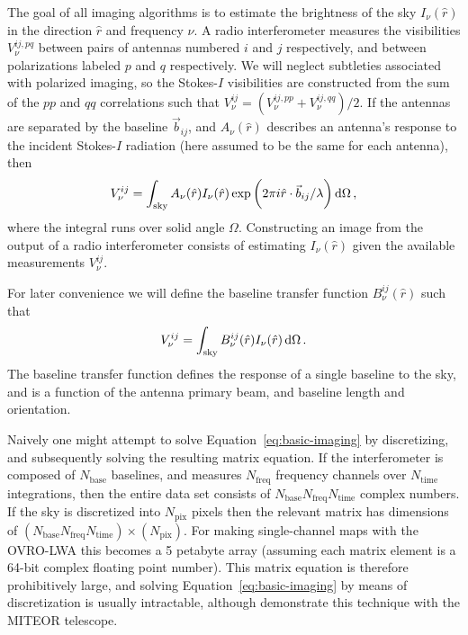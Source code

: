 \documentclass[twocolumn]{aastex61}
\renewcommand{\d}{{\rm d}}
\begin{document}
The goal of all imaging algorithms is to estimate the brightness of the sky $I_\nu(\hat r)$ in the
direction $\hat r$ and frequency $\nu$.  A radio interferometer measures the visibilities
$V^{ij,pq}_{\nu}$ between pairs of antennas numbered $i$ and $j$ respectively, and between
polarizations labeled $p$ and $q$ respectively. We will neglect subtleties associated with polarized
imaging, so the Stokes-$I$ visibilities are constructed from the sum of the $pp$ and $qq$
correlations such that $V^{ij}_{\nu} = (V^{ij,pp}_{\nu}+V^{ij,qq}_{\nu})/2$.  If the antennas are
separated by the baseline $\vec b_{ij}$, and $A_\nu(\hat r)$ describes an antenna's response to the
incident Stokes-$I$ radiation (here assumed to be the same for each antenna), then
\begin{equation}\label{eq:basic-imaging}
    V^{ij}_\nu = \int_\text{sky}
                 A_\nu(\hat r) I_\nu(\hat r)
                 \exp\bigg(2\pi i \hat r\cdot\vec b_{ij}/\lambda\bigg) \,\d\Omega \, ,
\end{equation}
where the integral runs over solid angle $\Omega$.  Constructing an image from the output of a radio
interferometer consists of estimating $I_\nu(\hat r)$ given the available measurements $V^{ij}_\nu$.

For later convenience we will define the baseline transfer function $B^{ij}_\nu(\hat r)$ such that
\begin{equation}\label{eq:baseline-transfer-function}
    V^{ij}_\nu = \int_\text{sky} B^{ij}_\nu(\hat r) I_\nu(\hat r) \,\d\Omega \, .
\end{equation}
The baseline transfer function defines the response of a single baseline to the sky, and is a
function of the antenna primary beam, and baseline length and orientation.

Naively one might attempt to solve Equation~\ref{eq:basic-imaging} by discretizing, and subsequently
solving the resulting matrix equation. If the interferometer is composed of $N_\text{base}$
baselines, and measures $N_\text{freq}$ frequency channels over $N_\text{time}$ integrations, then
the entire data set consists of $N_\text{base}N_\text{freq}N_\text{time}$ complex numbers. If the
sky is discretized into $N_\text{pix}$ pixels then the relevant matrix has dimensions of
$(N_\text{base}N_\text{freq}N_\text{time})\times(N_\text{pix})$. For making single-channel maps with
the OVRO-LWA this becomes a 5 petabyte array (assuming each matrix element is a 64-bit complex
floating point number).  This matrix equation is therefore prohibitively large, and solving
Equation~\ref{eq:basic-imaging} by means of discretization is usually intractable, although
\citet{2017MNRAS.465.2901Z} demonstrate this technique with the MITEOR telescope.
\end{document}
